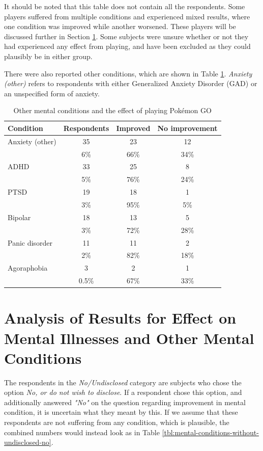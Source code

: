It should be noted that this table does not contain all the respondents. Some players suffered from multiple conditions and experienced mixed results, where one condition was improved while another worsened. These players will be discussed further in Section \ref{sec:mental-conditions-analysis}. Some subjects were unsure whether or not they had experienced any effect from playing, and have been excluded as they could plausibly be in either group.

There were also reported other conditions, which are shown in Table \ref{tbl:other-mental-conditions-effect}. \emph{Anxiety (other)} refers to respondents with either Generalized Anxiety Disorder (GAD) or an unspecified form of anxiety.

\begin{table}[h]
	\centering
	\caption{Other mental conditions and the effect of playing Pokémon GO}
	\label{tbl:other-mental-conditions-effect}
	\begin{tabular}{|l|c|c|c|}
		\hline
		\textbf{Condition} & \textbf{Respondents} & \textbf{Improved} & \textbf{No improvement}\\
		\hline\hline
		Anxiety (other)	& 35	& 23	& 12\\
						& 6\%	& 66\%	& 34\%\\\hline
		ADHD			& 33	& 25	& 8\\
						& 5\%	& 76\%	& 24\%\\\hline
		PTSD			& 19	& 18	& 1\\
						& 3\%	& 95\%	& 5\%\\\hline
		Bipolar			& 18	& 13	& 5\\
						& 3\%	& 72\%	& 28\%\\\hline
		Panic disorder	& 11	& 11	& 2\\
						& 2\%	& 82\%	& 18\%\\\hline
		Agoraphobia		& 3		& 2		& 1\\
						& 0.5\%	& 67\%	& 33\%\\\hline
	\end{tabular}
\end{table}

\section{Analysis of Results for Effect on Mental Illnesses and Other Mental Conditions}
\label{sec:mental-conditions-analysis}

The respondents in the \emph{No/Undisclosed} category are subjects who chose the option \emph{No, or do not wish to disclose}. If a respondent chose this option, and additionally answered \emph{"No"} on the question regarding improvement in mental condition, it is uncertain what they meant by this. If we assume that these respondents are not suffering from any condition, which is plausible, the combined numbers would instead look as in Table \ref{tbl:mental-conditions-without-undisclosed-no}.

